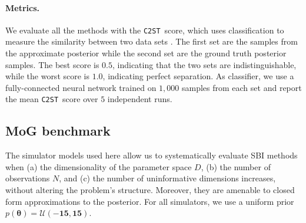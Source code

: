 \documentclass[twoside]{article}
\newcommand{\thb}{\boldsymbol{\theta}}
\newcommand{\CtwoST}{\texttt{C2ST}}
\begin{document}
\paragraph{Metrics.}
We evaluate all the methods with the \CtwoST~score, which uses classification to measure the similarity between two data sets \citep{gutmann2018likelihood, lueckmann2021benchmarking}. The first set are the samples from the approximate posterior while the second set are the ground truth posterior samples. The best score is $0.5$, indicating that the two sets are indistinguishable, while the worst score is $1.0$, indicating perfect separation.
As classifier, we use a fully-connected neural network trained on $1,000$ samples from each set and report the mean \CtwoST~score over $5$ independent runs.

\subsection{MoG benchmark}
\label{subsec:gaussian}
The simulator models used here allow us to systematically evaluate SBI methods when (a) the dimensionality of the parameter space $D$, (b) the number of observations $N$, and (c) the number of uninformative dimensions increases, without altering the problem's structure. Moreover, they are amenable to closed form approximations to the posterior. For all simulators, we use a uniform prior $p(\thb) = \mathcal{U}(\mathbf{-15}, \mathbf{15})$.
\end{document}
